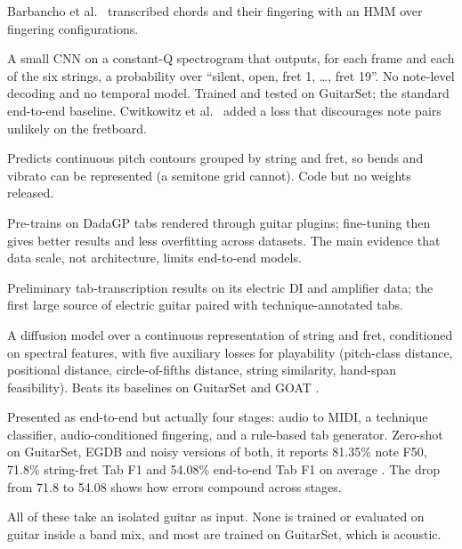 \begin{description}[style=nextline,leftmargin=1.2cm]
\item[Before deep learning] Barbancho et al.~\cite{barbancho2012chords}
  transcribed chords and their fingering with an HMM over fingering
  configurations.
\item[TabCNN (2019)] \cite{wiggins2019tabcnn} A small CNN on a constant-Q
  spectrogram that outputs, for each frame and each of the six strings, a
  probability over ``silent, open, fret 1, \ldots, fret 19''. No note-level
  decoding and no temporal model. Trained and tested on GuitarSet; the standard
  end-to-end baseline. Cwitkowitz et al.~\cite{cwitkowitz2022inhibition} added a
  loss that discourages note pairs unlikely on the fretboard.
\item[FretNet (2023)] \cite{cwitkowitz2023fretnet} Predicts continuous pitch
  contours grouped by string and fret, so bends and vibrato can be represented
  (a semitone grid cannot). Code but no weights released.
\item[SynthTab (2024)] \cite{zang2024synthtab} Pre-trains on DadaGP tabs
  rendered through guitar plugins; fine-tuning then gives better results and
  less overfitting across datasets. The main evidence that data scale, not
  architecture, limits end-to-end models.
\item[GOAT (2025)] \cite{loth2025goat} Preliminary tab-transcription results on
  its electric DI and amplifier data; the first large source of electric guitar
  paired with technique-annotated tabs.
\item[Noise2Fret (2026)] \cite{simionato2026noise2fret} A diffusion model over a
  continuous representation of string and fret, conditioned on spectral
  features, with five auxiliary losses for playability (pitch-class distance,
  positional distance, circle-of-fifths distance, string similarity, hand-span
  feasibility). Beats its baselines on GuitarSet and GOAT \reported.
\item[TART (2025--2026)] \cite{gupta2025tart,gupta2026tart} Presented as
  end-to-end but actually four stages: audio to MIDI, a technique classifier,
  audio-conditioned fingering, and a rule-based tab generator. Zero-shot on
  GuitarSet, EGDB and noisy versions of both, it reports 81.35\% note F50,
  71.8\% string-fret Tab F1 and 54.08\% end-to-end Tab F1 on average
  \reported. The drop from 71.8 to 54.08 shows how errors compound across
  stages.
\end{description}

All of these take an isolated guitar as input. None is trained or evaluated on
guitar inside a band mix, and most are trained on GuitarSet, which is acoustic.

